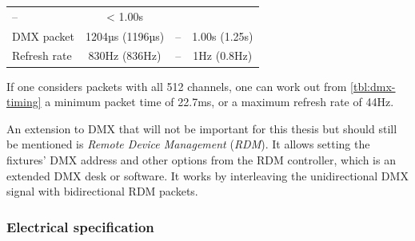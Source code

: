 \begin{longtable}[]{@{}lccc@{}}
\begin{minipage}[t]{0.18\columnwidth}
--\strut
\end{minipage} & \begin{minipage}[t]{0.18\columnwidth}\centering\strut
\textless{} 1.00s\strut
\end{minipage}\tabularnewline
\begin{minipage}[t]{0.31\columnwidth}\raggedright\strut
DMX packet\strut
\end{minipage} & \begin{minipage}[t]{0.18\columnwidth}\centering\strut
1204µs (1196µs)\strut
\end{minipage} & \begin{minipage}[t]{0.18\columnwidth}\centering\strut
--\strut
\end{minipage} & \begin{minipage}[t]{0.18\columnwidth}\centering\strut
1.00s (1.25s)\strut
\end{minipage}\tabularnewline
\begin{minipage}[t]{0.31\columnwidth}\raggedright\strut
Refresh rate\strut
\end{minipage} & \begin{minipage}[t]{0.18\columnwidth}\centering\strut
830Hz (836Hz)\strut
\end{minipage} & \begin{minipage}[t]{0.18\columnwidth}\centering\strut
--\strut
\end{minipage} & \begin{minipage}[t]{0.18\columnwidth}\centering\strut
1Hz (0.8Hz)\strut
\end{minipage}\tabularnewline
\bottomrule
\end{longtable}

If one considers packets with all 512 channels, one can work out from
\cref{tbl:dmx-timing} a minimum packet time of 22.7ms, or a maximum
refresh rate of 44Hz.

An extension to DMX that will not be important for this thesis but
should still be mentioned is \emph{Remote Device Management}
(\emph{RDM}). It allows setting the fixtures' DMX address and other
options from the RDM controller, which is an extended DMX desk or
software. It works by interleaving the unidirectional DMX signal with
bidirectional RDM packets.

\hypertarget{sec:dmx-electrical}{\subsubsection{Electrical
specification}\label{sec:dmx-electrical}}

